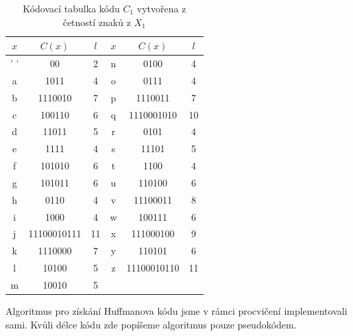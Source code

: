 \documentclass[czech]{mvi-report}
\begin{document}
\begin{table}
  \caption{Kódovací tabulka kódu $C_1$ vytvořena z četností znaků z $X_1$}
  \centering
  \begin{tabular}{|ccc|ccc|}
  \hline
  \rowcolor[rgb]{0.722,0.722,0.722} $x$ & $C(x)$        & $l$  & $x$ & $C(x)$        & $l$   \\
  \hline
  \rowcolor[rgb]{0.82,0.82,0.82} ' '  & 00          & 2  & n & 0100        & 4   \\
  \rowcolor[rgb]{0.941,0.941,0.941} a & 1011        & 4  & o & 0111        & 4   \\
  \rowcolor[rgb]{0.722,0.722,0.722} b & 1110010     & 7  & p & 1110011     & 7   \\
  \rowcolor[rgb]{0.82,0.82,0.82} c    & 100110      & 6  & q & 1110001010  & 10  \\
  \rowcolor[rgb]{0.941,0.941,0.941} d & 11011       & 5  & r & 0101        & 4   \\
  \rowcolor[rgb]{0.722,0.722,0.722} e & 1111        & 4  & s & 11101       & 5   \\
  \rowcolor[rgb]{0.82,0.82,0.82} f    & 101010      & 6  & t & 1100        & 4   \\
  \rowcolor[rgb]{0.941,0.941,0.941} g & 101011      & 6  & u & 110100      & 6   \\
  \rowcolor[rgb]{0.722,0.722,0.722} h & 0110        & 4  & v & 11100011    & 8   \\
  \rowcolor[rgb]{0.82,0.82,0.82} i    & 1000        & 4  & w & 100111      & 6   \\
  \rowcolor[rgb]{0.941,0.941,0.941} j & 11100010111 & 11 & x & 111000100   & 9   \\
  \rowcolor[rgb]{0.722,0.722,0.722} k & 1110000     & 7  & y & 110101      & 6   \\
  \rowcolor[rgb]{0.82,0.82,0.82} l    & 10100       & 5  & z & 11100010110 & 11  \\
  \rowcolor[rgb]{0.941,0.941,0.941} m & 10010       & 5  &   &             &     \\
  \hline
  \end{tabular}
  \label{tab:codebook}
  \end{table}

Algoritmus pro získání Huffmanova kódu jsme v rámci procvičení implementovali sami. Kvůli délce kódu zde popíšeme algoritmus pouze pseudokódem.
\end{document}
